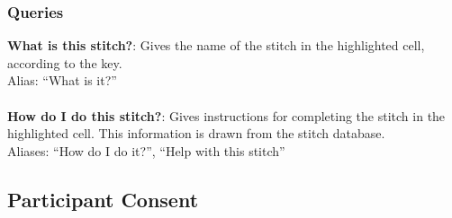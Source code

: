 \documentclass[11pt,twocolumn]{article}
\begin{document}
\subsubsection{Queries}

\textbf{What is this stitch?}: Gives the name of the stitch in the highlighted cell, according to the key.
\\ Alias: ``What is it?''
\\ \\
\textbf{How do I do this stitch?}: Gives instructions for completing the stitch in the highlighted cell.
This information is drawn from the stitch database.
\\ Aliases: ``How do I do it?'', ``Help with this stitch''

\subsection{Participant Consent} \label{consent}
\end{document}
